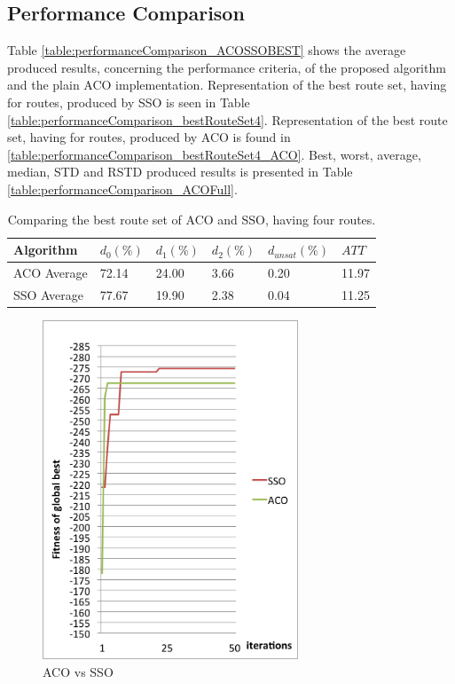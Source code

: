 \subsection{Performance Comparison}
\label{subsec:performanceComparison_results}


Table \vref{table:performanceComparison_ACOSSOBEST} shows the average produced results, concerning the performance criteria, of the proposed algorithm and the plain ACO implementation. Representation of the best route set, having for routes, produced by SSO is seen in Table \vref{table:performanceComparison_bestRouteSet4}.  Representation of the best route set, having for routes, produced by ACO is found in \vref{table:performanceComparison_bestRouteSet4_ACO}. Best, worst, average, median, STD and RSTD produced results is presented in Table \vref{table:performanceComparison_ACOFull}.

    \begin{table}[H]
    \centering
    \begin{tabular}{|l||l|l|l|l|l|}
    \hline
    Algorithm & $d_0(\%)$ & $d_1(\%)$ & $d_2(\%)$ & $d_{unsat}(\%)$ & $ATT$ \\
    \hline
    ACO Average & 72.14 & 24.00 & 3.66 & 0.20 & 11.97 \\
    \hline
    SSO Average & 77.67 & 19.90 & 2.38 & 0.04 & 11.25 \\
    \hline
    \end{tabular}
    \caption {Comparing the best route set of ACO and SSO, having four routes.}
    
    \label{table:performanceComparison_ACOSSOBEST}
    \end{table}

    \begin{figure}[H]
    \begin{center}
    \includegraphics[width=3in]{assets/acovssso.png}
    \end{center}
    \caption{ACO vs SSO}
    \label{fig:acovssso} 
    \end{figure}

